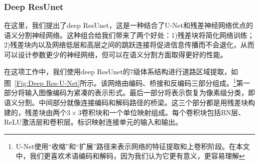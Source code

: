 \begin{translation}
\subsubsection{Deep ResUnet}
在这里，我们提出了deep ResUnet，这是一种结合了U-Net和残差神经网络优点的语义分割神经网络。这种组合给我们带来了两个好处：1)残差块将简化网络训练；2)残差块内以及网络低层和高层之间的跳跃连接将促进信息传播而不会退化，从而可以设计参数更少的神经网络，但可以在语义分割方面取得更好的性能。

在这项工作中，我们使用deep ResUnet的7级体系结构进行道路区域提取，如图~\ref{Fig:Deep Res-U-Net}所示。该网络由编码、桥接和反编码三部分组成。\footnote{U-Net使用“收缩”和“扩展”路径来表示网络的特征提取和上卷积阶段。在本文中，我们更喜欢术语编码和解码，因为我们认为它更有意义，更容易理解}第一部分将输入图像编码为紧凑的表示形式。最后一部分将表示恢复为像素级分类，即语义分割。中间部分就像连接编码和解码路径的桥梁。这三个部分都是用残差块构建的，残差块由两个$3\times 3$卷积块和一个单位映射组成。每个卷积块包括BN层、ReLU激活层和卷积层。标识映射连接单元的输入和输出。


\end{translation}
